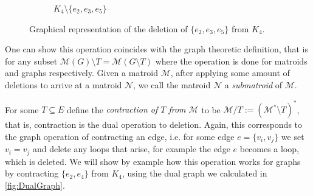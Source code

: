 \documentclass[12pt]{report}
\theoremstyle{definition}
\def\calM{\mathcal M}
\def\calN{\mathcal N}
\theoremstyle{upright}
\begin{document}
\begin{figure}[htbp]
\begin{center}
\begin{subfigure}[c]{0.45\linewidth}
\begin{center}
\begin{tikzpicture}
                \end{tikzpicture}
                \end{center}

            \caption{$K_4\setminus\{e_2, e_3, e_5\}$}
                
        \end{subfigure}
        
    \end{center}

    \caption{Graphical representation of the deletion of $\{e_2, e_3, e_5\}$ from $K_4$.}\label{fig:GraphDeletion}

\end{figure}

One can show this operation coincides with the graph theoretic definition, that is for any subset $\calM(G)\setminus T=\calM(G\setminus T)$ where the operation is done for matroids and graphs respectively.
Given a matroid $\calM$, after applying some amount of deletions to arrive at a matroid $\calN$, we call the matroid $\calN$ a \textit{submatroid} of $\calM$.

For some $T\subseteq E$ define the \textit{contraction of $T$ from $\calM$} to be $\calM/T:=(\calM^*\setminus T)^*$, that is, contraction is the dual operation to deletion.
Again, this corresponds to the graph operation of contracting an edge, i.e. for some edge $e=\{v_i, v_j\}$ we set $v_i=v_j$ and delete any loops that arise, for example the edge $e$ becomes a loop, which is deleted.
We will show by example how this operation works for graphs by contracting $\{e_2, e_4\}$ from $K_4$, using the dual graph we calculated in \cref{fig:DualGraph}.
\end{document}
